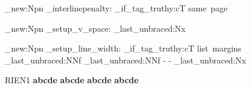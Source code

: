 \cs_new:Npn \CDR_interlinepenalty: {
  \CDR_if_tag_truthy:cT { same~page } {
    \interlinepenalty\@M
  }
}

\cs_new:Npn \CDR_setup_v_space: {
  \exp_last_unbraced:Nx
   \relax
}

\cs_new:Npn \CDR_setup_line_width: {%
  \CDR_if_tag_truthy:cT { list~margins } {
    \advance\leftmargin\@totalleftmargin
  }
  \exp_last_unbraced:NNf
  \advance{} \relax
  \exp_last_unbraced:NNf
  \advance{} \relax
  \linewidth\hsize
  \advance\linewidth-\leftmargin
  \advance\linewidth-\rightmargin
  \exp_last_unbraced:Nx
   \relax
}

\ExplSyntaxOff
\makeatother
%
\begin{CDRBlockII} %
RIEN1
\textbf{abcde}
    \textbf{abcde}
	\textbf{abcde}
		\textbf{abcde}
\end{CDRBlockII}
\endinput
\lipsum[3]
Afterwards
\typeout{-------------------}
\CDRSet{pygments}
\begin{CDRBlockII}
RIEN2
\def\foo#1{
  \textbf{#1}
}
\end{CDRBlockII}
ABCDE
\trivlist\item ABCDE
\endtrivlist
GHJKL
\endinput




\NewDocumentEnvironment { CDRBlockIII } { o } {
  \IfValueTF { #1 } {
    \clist_set:Nn \FV@KeyValues { #1 }
    \def\FV@BeginScanning{}
  } {
    \clist_clear:N \FV@KeyValue
  }
  \FVB@CDRBlock
} {
  \FVE@CDRBlock
}
\ExplSyntaxOff
\makeatother


